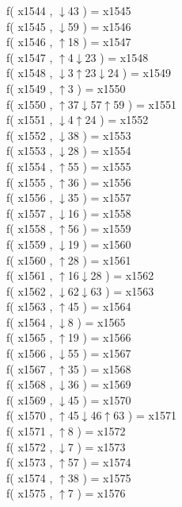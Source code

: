 f( x1544 , $\downarrow$43 ) = x1545 \\
f( x1545 , $\downarrow$59 ) = x1546 \\
f( x1546 , $\uparrow$18 ) = x1547 \\
f( x1547 , $\uparrow$4$\downarrow$23 ) = x1548 \\
f( x1548 , $\downarrow$3$\uparrow$23$\downarrow$24 ) = x1549 \\
f( x1549 , $\uparrow$3 ) = x1550 \\
f( x1550 , $\uparrow$37$\downarrow$57$\uparrow$59 ) = x1551 \\
f( x1551 , $\downarrow$4$\uparrow$24 ) = x1552 \\
f( x1552 , $\downarrow$38 ) = x1553 \\
f( x1553 , $\downarrow$28 ) = x1554 \\
f( x1554 , $\uparrow$55 ) = x1555 \\
f( x1555 , $\uparrow$36 ) = x1556 \\
f( x1556 , $\downarrow$35 ) = x1557 \\
f( x1557 , $\downarrow$16 ) = x1558 \\
f( x1558 , $\uparrow$56 ) = x1559 \\
f( x1559 , $\downarrow$19 ) = x1560 \\
f( x1560 , $\uparrow$28 ) = x1561 \\
f( x1561 , $\uparrow$16$\downarrow$28 ) = x1562 \\
f( x1562 , $\downarrow$62$\downarrow$63 ) = x1563 \\
f( x1563 , $\uparrow$45 ) = x1564 \\
f( x1564 , $\downarrow$8 ) = x1565 \\
f( x1565 , $\uparrow$19 ) = x1566 \\
f( x1566 , $\downarrow$55 ) = x1567 \\
f( x1567 , $\uparrow$35 ) = x1568 \\
f( x1568 , $\downarrow$36 ) = x1569 \\
f( x1569 , $\downarrow$45 ) = x1570 \\
f( x1570 , $\uparrow$45$\downarrow$46$\uparrow$63 ) = x1571 \\
f( x1571 , $\uparrow$8 ) = x1572 \\
f( x1572 , $\downarrow$7 ) = x1573 \\
f( x1573 , $\uparrow$57 ) = x1574 \\
f( x1574 , $\uparrow$38 ) = x1575 \\
f( x1575 , $\uparrow$7 ) = x1576 \\
